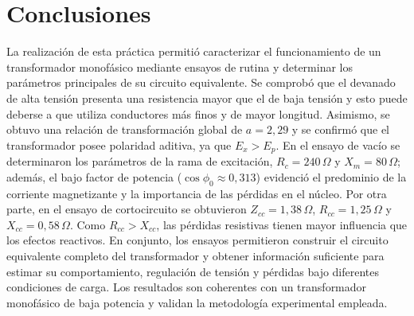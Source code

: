 \section{Conclusiones}

La realización de esta práctica permitió caracterizar el funcionamiento de un transformador monofásico mediante ensayos de rutina y determinar los parámetros principales de su circuito equivalente. Se comprobó que el devanado de alta tensión presenta una resistencia mayor que el de baja tensión y esto puede deberse a que utiliza conductores más finos y de mayor longitud. Asimismo, se obtuvo una relación de transformación global de $a=2,29$ y se confirmó que el transformador posee polaridad aditiva, ya que $E_x>E_p$. En el ensayo de vacío se determinaron los parámetros de la rama de excitación, $R_c=240\,\Omega$ y $X_m=80\,\Omega$; además, el bajo factor de potencia ($\cos\phi_0\approx0,313$) evidenció el predominio de la corriente magnetizante y la importancia de las pérdidas en el núcleo. Por otra parte, en el ensayo de cortocircuito se obtuvieron $Z_{cc}=1,38\,\Omega$, $R_{cc}=1,25\,\Omega$ y $X_{cc}=0,58\,\Omega$. Como $R_{cc}>X_{cc}$, las pérdidas resistivas tienen mayor influencia que los efectos reactivos. En conjunto, los ensayos permitieron construir el circuito equivalente completo del transformador y obtener información suficiente para estimar su comportamiento, regulación de tensión y pérdidas bajo diferentes condiciones de carga. Los resultados son coherentes con un transformador monofásico de baja potencia y validan la metodología experimental empleada.